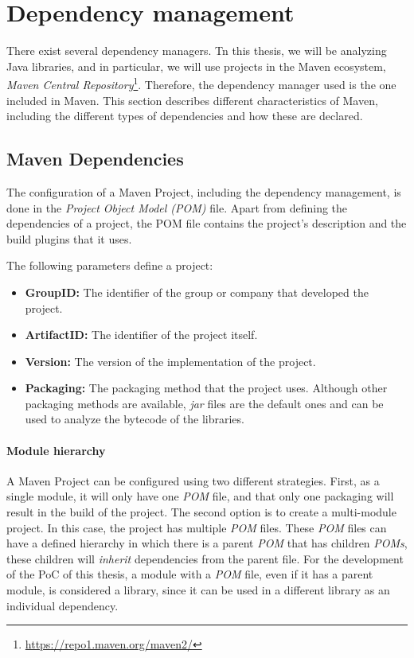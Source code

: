 \section{Dependency management}
There exist several dependency managers. Tn this thesis, we will be analyzing Java libraries, and in particular, we will use projects in the Maven ecosystem, \textit{Maven Central Repository}\footnote{\url{https://repo1.maven.org/maven2/}}. Therefore, the dependency manager used is the one included in Maven. This section describes different characteristics of Maven, including the different types of dependencies and how these are declared.

\subsection{Maven Dependencies}
The configuration of a Maven Project, including the dependency management, is done in the \textit{Project Object Model (POM)} file. Apart from defining the dependencies of a project, the POM file contains the project's description and the build plugins that it uses.

The following parameters define a project:

\begin{itemize}
  \item \textbf{GroupID:} The identifier of the group or company that developed the project.
  \item \textbf{ArtifactID:} The identifier of the project itself.
  \item \textbf{Version:} The version of the implementation of the project.
  \item \textbf{Packaging:} The packaging method that the project uses. Although other packaging methods are available, \textit{jar} files are the default ones and can be used to analyze the bytecode of the libraries.
\end{itemize}

\paragraph{Module hierarchy}
A Maven Project can be configured using two different strategies. First, as a single module, it will only have one \textit{POM} file, and that only one packaging will result in the build of the project. The second option is to create a multi-module project. In this case, the project has multiple \textit{POM} files. These \textit{POM} files can have a defined hierarchy in which there is a parent \textit{POM} that has children \textit{POMs}, these children will \textit{inherit} dependencies from the parent file. For the development of the PoC of this thesis, a module with a \textit{POM} file, even if it has a parent module, is considered a library, since it can be used in a different library as an individual dependency.

